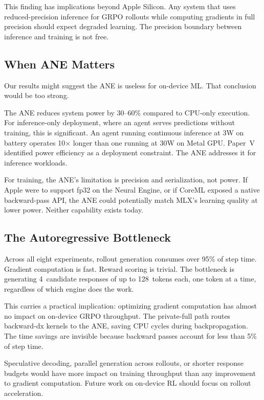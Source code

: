 \documentclass[11pt]{article}
\begin{document}
This finding has implications beyond Apple Silicon.  Any system that uses reduced-precision inference for GRPO rollouts while computing gradients in full precision should expect degraded learning.  The precision boundary between inference and training is not free.

\subsection{When ANE Matters}

Our results might suggest the ANE is useless for on-device ML.  That conclusion would be too strong.

The ANE reduces system power by 30--60\% compared to CPU-only execution.  For inference-only deployment, where an agent serves predictions without training, this is significant.  An agent running continuous inference at 3W on battery operates 10$\times$ longer than one running at 30W on Metal GPU.  Paper~V~\cite{maloney2025moe} identified power efficiency as a deployment constraint.  The ANE addresses it for inference workloads.

For training, the ANE's limitation is precision and serialization, not power.  If Apple were to support fp32 on the Neural Engine, or if CoreML exposed a native backward-pass API, the ANE could potentially match MLX's learning quality at lower power.  Neither capability exists today.

\subsection{The Autoregressive Bottleneck}

Across all eight experiments, rollout generation consumes over 95\% of step time.  Gradient computation is fast.  Reward scoring is trivial.  The bottleneck is generating 4~candidate responses of up to 128~tokens each, one token at a time, regardless of which engine does the work.

This carries a practical implication: optimizing gradient computation has almost no impact on on-device GRPO throughput.  The private-full path routes backward-dx kernels to the ANE, saving CPU cycles during backpropagation.  The time savings are invisible because backward passes account for less than 5\% of step time.

Speculative decoding, parallel generation across rollouts, or shorter response budgets would have more impact on training throughput than any improvement to gradient computation.  Future work on on-device RL should focus on rollout acceleration.
\end{document}
